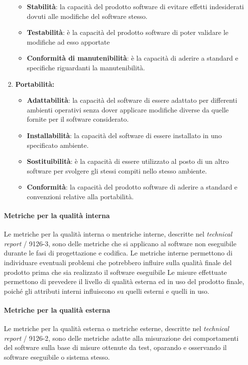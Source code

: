 \begin{enumerate}
\begin{itemize}
      \item \textbf{Stabilità}: la capacità del prodotto software di evitare effetti indesiderati dovuti alle modifiche del software stesso.
      \item \textbf{Testabilità}: è la capacità del prodotto software di poter validare le modifiche ad esso apportate
      \item \textbf{Conformità di manutenibilità}: è la capacità di aderire a standard e specifiche riguardanti la manutenibilità.
    \end{itemize}
    \item \textbf{Portabilità:}
    \begin{itemize}
      \item \textbf{Adattabilità}: la capacità del software di essere adattato per differenti ambienti operativi senza dover applicare modifiche diverse da quelle fornite per il software considerato.
      \item \textbf{Installabilità}: la capacità del software di essere installato in uno specificato ambiente.
      \item \textbf{Sostituibilità}: è la capacità di essere utilizzato al posto di un altro software per svolgere gli stessi compiti nello stesso ambiente.
      \item \textbf{Conformità}: la capacità del prodotto software di aderire a standard e convenzioni relative alla portabilità.
    \end{itemize}
  \end{enumerate}

  \paragraph{Metriche per la qualità interna}
    Le metriche per la qualità interna o mentriche interne, descritte nel \emph{technical report} / 9126-3,
    sono delle metriche che si applicano al software non eseguibile durante le fasi di progettazione e codifica.
    Le metriche interne permettono di individuare eventuali problemi che potrebbero influire sulla qualità finale del prodotto prima che sia realizzato il software eseguibile
    Le misure effettuate permettono di prevedere il livello di qualità esterna ed in uso del prodotto finale,
    poiché gli attributi interni influiscono su quelli esterni e quelli in uso.\\

  \paragraph{Metriche per la qualità esterna}
    Le metriche per la qualità esterna o metriche esterne, descritte nel \emph{technical report} / 9126-2,
    sono delle metriche adatte alla misurazione dei comportamenti del software sulla base di misure ottenute da test, oparando e osservando il software eseguibile o sistema stesso.\\

